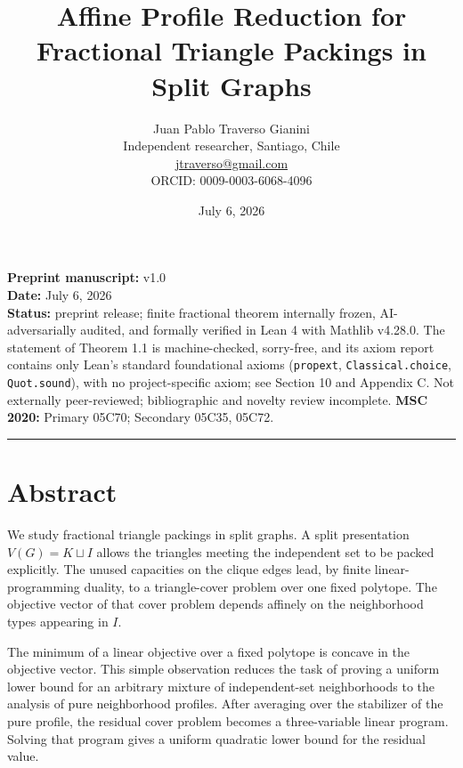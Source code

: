 \documentclass[
  11pt,
]{article}
\title{Affine Profile Reduction for Fractional Triangle Packings in Split Graphs}
\author{Juan Pablo Traverso Gianini\\
\small Independent researcher, Santiago, Chile\\
\small \href{mailto:jtraverso@gmail.com}{jtraverso@gmail.com}\\
\small ORCID: 0009-0003-6068-4096}
\date{July 6, 2026}
\begin{document}
\sloppy
\maketitle
\begin{small}\begin{raggedright}

\textbf{Preprint manuscript:} v1.0\\
\textbf{Date:} July 6, 2026\\
\textbf{Status:} preprint release; finite fractional theorem internally
frozen, AI-adversarially audited, and formally verified in Lean 4 with
Mathlib v4.28.0. The statement of Theorem 1.1 is machine-checked,
sorry-free, and its axiom report contains only Lean's standard
foundational axioms (\texttt{propext}, \texttt{Classical.choice},
\texttt{Quot.sound}), with no project-specific axiom; see Section 10 and
Appendix C. Not externally peer-reviewed; bibliographic and novelty
review incomplete. \textbf{MSC 2020:} Primary 05C70; Secondary 05C35,
05C72.

\begin{center}\rule{0.5\linewidth}{0.5pt}\end{center}

\end{raggedright}\end{small}

\section{Abstract}\label{abstract}

We study fractional triangle packings in split graphs. A split
presentation \(V(G)=K\sqcup I\) allows the triangles meeting the
independent set to be packed explicitly. The unused capacities on the
clique edges lead, by finite linear-programming duality, to a
triangle-cover problem over one fixed polytope. The objective vector of
that cover problem depends affinely on the neighborhood types appearing
in \(I\).

The minimum of a linear objective over a fixed polytope is concave in
the objective vector. This simple observation reduces the task of
proving a uniform lower bound for an arbitrary mixture of
independent-set neighborhoods to the analysis of pure neighborhood
profiles. After averaging over the stabilizer of the pure profile, the
residual cover problem becomes a three-variable linear program. Solving
that program gives a uniform quadratic lower bound for the residual
value.
\end{document}
